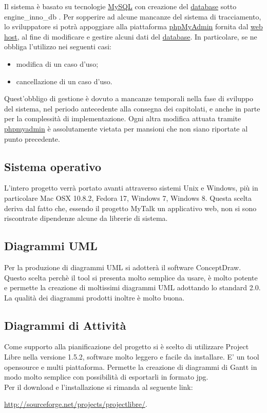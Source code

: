 Il sistema è basato su tecnologie \underline{MySQL} con creazione del \underline{database} sotto engine\_inno\_db . Per sopperire ad alcune mancanze del sistema di tracciamento, lo sviluppatore si potrà appoggiare alla piattaforma \underline{phpMyAdmin} fornita dal \underline{web host}, al fine di modificare e gestire alcuni dati del \underline{database}. In particolare, se ne obbliga l'utilizzo nei seguenti casi:
\begin{itemize}
\item modifica di un caso d'uso;
\item cancellazione di un caso d'uso.
\end{itemize}
Quest'obbligo di gestione è dovuto a mancanze temporali nella fase di sviluppo del sistema, nel periodo antecedente alla consegna dei capitolati, e anche in parte per la complessità di implementazione.
\newline
Ogni altra modifica attuata tramite \underline{phpmyadmin} è assolutamente vietata per mansioni che non siano riportate al punto precedente.


\subsection{Sistema operativo}
L'intero progetto verrà portato avanti attraverso sistemi Unix e Windows, più in particolare Mac OSX 10.8.2, Fedora 17, Windows 7, Windows 8. Questa scelta deriva dal fatto che, essendo il progetto MyTalk un applicativo web, non si sono riscontrate dipendenze alcune da librerie di sistema.

\subsection{Diagrammi UML}
Per la produzione di diagrammi UML si adotterà il software ConceptDraw. Questo scelta perchè il tool si presenta molto semplice da usare, è molto potente e permette la creazione di moltissimi diagrammi UML adottando lo standard 2.0. La qualità dei diagrammi prodotti inoltre è molto buona.

\subsection{Diagrammi di Attività}
Come supporto alla pianificazione del progetto si è scelto di utilizzare Project Libre nella versione 1.5.2, software molto leggero e facile da installare. E' un tool opensource e multi piattaforma. Permette la creazione di diagrammi di Gantt in modo molto semplice con possibilità di esportarli in formato jpg.\\
Per il download e l'installazione si rimanda al seguente link:
\begin{center}
\url{http://sourceforge.net/projects/projectlibre/}.
\end{center}

